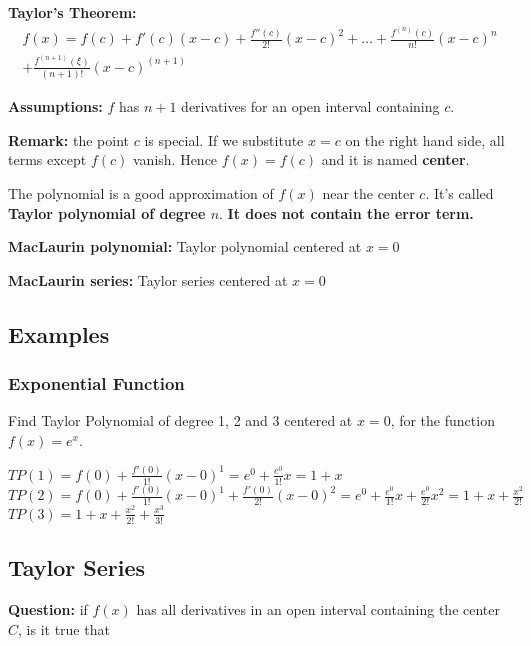 \textbf{Taylor's Theorem:}\begin{equation*}
\begin{split}
f(x) = f(c) + f'(c)(x-c) + \frac{f''(c)}{2!}(x-c)^2 + \dots + \frac{f^{(n)}(c)}{n!}(x-c)^n \\+ \frac{f^{(n+1)}(\xi)}{(n+1)!}(x-c)^{(n+1)}
\end{split}
\end{equation*}

\textbf{Assumptions:} $f$ has $n + 1$ derivatives for an open interval containing $c$.

\textbf{Remark:} the point $c$ is special. If we substitute $x = c$ on the right hand side, all terms except $f(c)$ vanish. Hence $f(x) = f(c)$ and it is named \textbf{center}.

The polynomial is a good approximation of $f(x)$ near the center $c$. It's called \textbf{Taylor polynomial of degree $n$}. \textbf{It does not contain the error term.}

\textbf{MacLaurin polynomial:} Taylor polynomial centered at $x = 0$

\textbf{MacLaurin series:} Taylor series centered at $x = 0$

\subsection{Examples}

\subsubsection{Exponential Function}

Find Taylor Polynomial of degree 1, 2 and 3 centered at $x = 0$, for the function $f(x) = e^x$.

$TP(1) = f(0) + \frac{f'(0)}{1!}(x - 0)^1 = e^0 + \frac{e^{0}}{1!}x = 1 + x$\\
$TP(2) = f(0) + \frac{f'(0)}{1!}(x - 0)^1 + \frac{f'(0)}{2!}(x - 0)^2 = e^0 + \frac{e^{0}}{1!}x + \frac{e^{0}}{2!}x^2 = 1 + x + \frac{x^2}{2!}$\\
$TP(3) = 1 + x + \frac{x^2}{2!} + \frac{x^3}{3!}$

\subsection{Taylor Series}

\textbf{Question:} if $f(x)$ has all derivatives in an open interval containing the center $C$, is it true that

